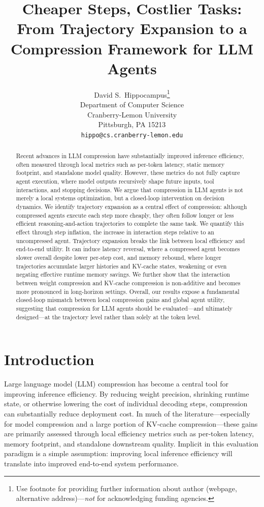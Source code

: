 \documentclass{article}
\title{Cheaper Steps, Costlier Tasks: From Trajectory Expansion to a Compression Framework for LLM Agents}
\author{%
  David S.~Hippocampus\thanks{Use footnote for providing further information
    about author (webpage, alternative address)---\emph{not} for acknowledging
    funding agencies.} \\
  Department of Computer Science\\
  Cranberry-Lemon University\\
  Pittsburgh, PA 15213 \\
  \texttt{hippo@cs.cranberry-lemon.edu} \\
}
\begin{document}
\maketitle


\begin{abstract}
Recent advances in LLM compression have substantially improved inference efficiency, often measured through local metrics such as per-token latency, static memory footprint, and standalone model quality. However, these metrics do not fully capture agent execution, where model outputs recursively shape future inputs, tool interactions, and stopping decisions. We argue that compression in LLM agents is not merely a local systems optimization, but a closed-loop intervention on decision dynamics. We identify trajectory expansion as a central effect of compression: although compressed agents execute each step more cheaply, they often follow longer or less efficient reasoning-and-action trajectories to complete the same task. We quantify this effect through step inflation, the increase in interaction steps relative to an uncompressed agent. Trajectory expansion breaks the link between local efficiency and end-to-end utility. It can induce latency reversal, where a compressed agent becomes slower overall despite lower per-step cost, and memory rebound, where longer trajectories accumulate larger histories and KV-cache states, weakening or even negating effective runtime memory savings. We further show that the interaction between weight compression and KV-cache compression is non-additive and becomes more pronounced in long-horizon settings. Overall, our results expose a fundamental closed-loop mismatch between local compression gains and global agent utility, suggesting that compression for LLM agents should be evaluated---and ultimately designed---at the trajectory level rather than solely at the token level.
\end{abstract}


\section{Introduction}

Large language model (LLM) compression has become a central tool for improving inference efficiency. By reducing weight precision, shrinking runtime state, or otherwise lowering the cost of individual decoding steps, compression can substantially reduce deployment cost. In much of the literature---especially for model compression and a large portion of KV-cache compression---these gains are primarily assessed through local efficiency metrics such as per-token latency, memory footprint, and standalone downstream quality. Implicit in this evaluation paradigm is a simple assumption: improving local inference efficiency will translate into improved end-to-end system performance.
\end{document}
